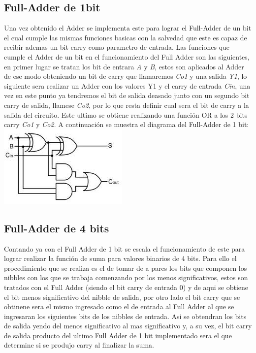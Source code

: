 \subsection{Full-Adder de 1bit}
 Una vez obtenido el Adder se implementa este para lograr el Full-Adder de un bit el cual cumple las mismas funciones basicas con la salvedad que este es capaz de recibir ademas un bit carry como parametro de entrada. Las funciones que cumple el Adder de un bit en el funcionamiento del Full Adder son las siguientes, en primer lugar se tratan los bit de entrara \emph{A} y \emph{B}, estos son aplicados al Adder de ese modo obteniendo un bit de carry que llamaremos \emph{Co1} y una salida \emph{Y1}, lo siguiente sera realizar un Adder con los valores Y1 y el carry de entrada \emph{Cin}, una vez en este punto ya tendremos el bit de salida deasado junto con un segundo bit carry de salida, llamese \emph{Co2}, por lo que resta definir cual sera el bit de carry a la salida del circuito. Este ultimo se obtiene realizando una función OR a los 2 bits carry \emph{Co1} y \emph{Co2}. A continuación se muestra el diagrama del Full-Adder de 1 bit:
\includegraphics[width=\textwidth]{Ejercicios/full adder.jpg}
\subsection{Full-Adder de 4 bits}
  Contando ya con el Full Adder de 1 bit se escala el funcionamiento de este para lograr realizar la función de suma para valores binarios de 4 bits. Para ello el procedimiento que se realiza es el de tomar de a pares los bits que componen los nibbles con los que se trabaja comenzando por los menos significativos, estos son tratados con el Full Adder (siendo el bit carry de entrada 0) y de aqui se obtiene el bit menos significativo del nibble de salida, por otro lado el bit carry que se obtinene sera el mismo ingresado como el de entrada al Full Adder al que se ingresaran los siguientes bits de los nibbles de entrada. Asi se obtendran los bits de salida yendo del menos significativo al mas significativo y, a su vez, el bit carry de salida producto del ultimo Full Adder de 1 bit implementado sera el que determine si se produjo carry al finalizar la suma.
\\
